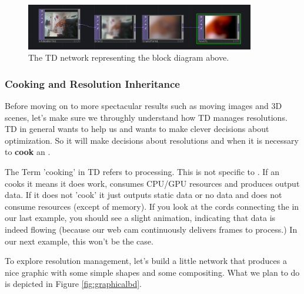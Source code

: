 \begin{figure}[H]
	\begin{center}
		\includegraphics[width = 10cm]{img/simple2Dproc.PNG}
		\caption{The TD network representing the block diagram above.}
		\label{fig:simpleProcTD}
	\end{center}
\end{figure}


\subsubsection{Cooking and Resolution Inheritance}
Before moving on to more spectacular results such as moving images and 3D scenes, let's make sure we throughly understand how TD manages resolutions. TD in general wants to help us and wants to make clever decisions about optimization. So it will make decisions about resolutions and when it is necessary to \textbf{cook} an \OP {}.
\begin{framed}
	The Term 'cooking' in TD refers to processing. This is not specific to \TOPs. If an \OP cooks it means it does work, consumes CPU/GPU resources and produces output data. If it does not 'cook' it just outputs static data or no data and does not consume resources (except of memory). If you look at the cords connecting the \OPs in our last example, you should see a slight animation, indicating that data is indeed flowing (because our web cam continuously delivers frames to process.) In our next example, this won't be the case.
\end{framed}
To explore resolution management, let's build a little network that produces a nice graphic with some simple shapes and some compositing. What we plan to do is depicted in Figure \ref{fig:graphicalbd}.


